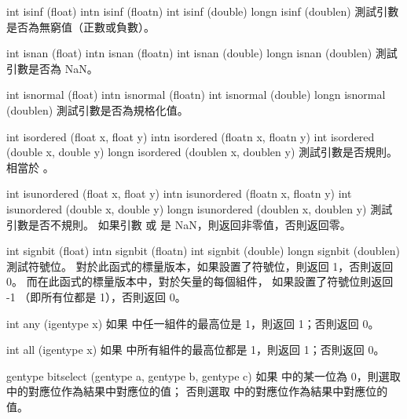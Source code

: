 int isinf (float)
intn isinf (floatn)
int isinf (double)
longn isinf (doublen)
\stopbuffer
{}
測試引數是否為無窮值（正數或負數）。
\stopbuffer

int isnan (float)
intn isnan (floatn)
int isnan (double)
longn isnan (doublen)
\stopbuffer
{}
測試引數是否為 NaN。
\stopbuffer

int isnormal (float)
intn isnormal (floatn)
int isnormal (double)
longn isnormal (doublen)
\stopbuffer
{}
測試引數是否為規格化值。
\stopbuffer

int isordered (float x, float y)
intn isordered (floatn x, floatn y)
int isordered (double x, double y)
longn isordered (doublen x, doublen y)
\stopbuffer
{}
測試引數是否規則。
相當於 。
\stopbuffer

int isunordered (float x, float y)
intn isunordered (floatn x, floatn y)
int isunordered (double x, double y)
longn isunordered (doublen x, doublen y)
\stopbuffer
{}
測試引數是否不規則。
如果引數  或  是 NaN，則返回非零值，否則返回零。
\stopbuffer

int signbit (float)
intn signbit (floatn)
int signbit (double)
longn signbit (doublen)
\stopbuffer
{}
測試符號位。
對於此函式的標量版本，如果設置了符號位，則返回 1，否則返回 0。
而在此函式的標量版本中，對於矢量的每個組件，
如果設置了符號位則返回 -1 （即所有位都是 1），否則返回 0。
\stopbuffer

int any (igentype x)
\stopbuffer
{}
如果  中任一組件的最高位是 1，則返回 1；否則返回 0。
\stopbuffer

int all (igentype x)
\stopbuffer
{}
如果  中所有組件的最高位都是 1，則返回 1；否則返回 0。
\stopbuffer

gentype bitselect (gentype a,
		gentype b,
		gentype c)
\stopbuffer
{}
如果  中的某一位為 0，則選取  中的對應位作為結果中對應位的值；
否則選取  中的對應位作為結果中對應位的值。
\stopbuffer


